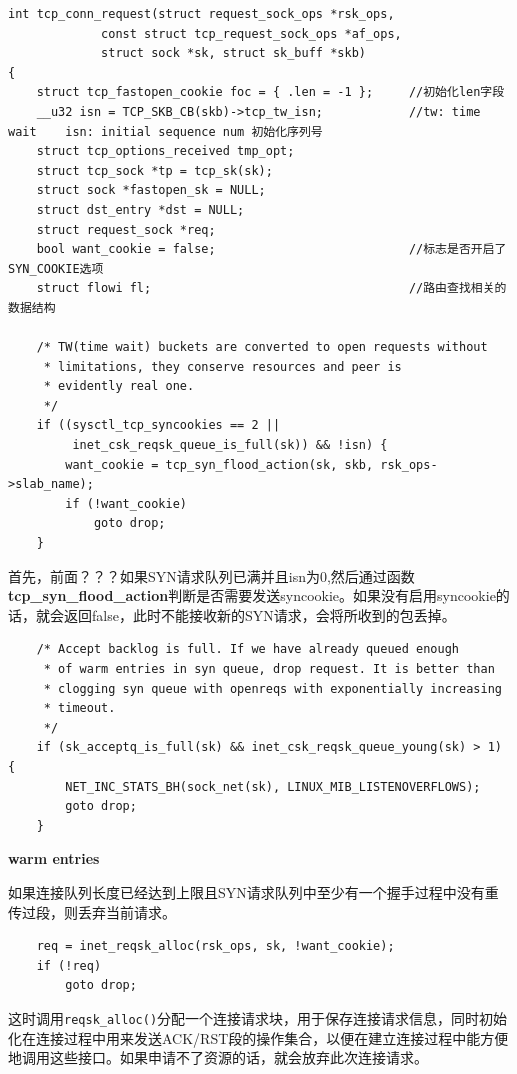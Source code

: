 \begin{verbatim}
int tcp_conn_request(struct request_sock_ops *rsk_ops,
             const struct tcp_request_sock_ops *af_ops,
             struct sock *sk, struct sk_buff *skb)
{
    struct tcp_fastopen_cookie foc = { .len = -1 };     //初始化len字段
    __u32 isn = TCP_SKB_CB(skb)->tcp_tw_isn;            //tw: time wait    isn: initial sequence num 初始化序列号 
    struct tcp_options_received tmp_opt;
    struct tcp_sock *tp = tcp_sk(sk);
    struct sock *fastopen_sk = NULL;
    struct dst_entry *dst = NULL;
    struct request_sock *req;
    bool want_cookie = false;                           //标志是否开启了SYN_COOKIE选项
    struct flowi fl;                                    //路由查找相关的数据结构

    /* TW(time wait) buckets are converted to open requests without
     * limitations, they conserve resources and peer is
     * evidently real one.
     */
    if ((sysctl_tcp_syncookies == 2 ||
         inet_csk_reqsk_queue_is_full(sk)) && !isn) {
        want_cookie = tcp_syn_flood_action(sk, skb, rsk_ops->slab_name);
        if (!want_cookie)
            goto drop;
    }
\end{verbatim}
                首先，前面？？？如果SYN请求队列已满并且isn为0,然后通过函数\textbf{tcp\_syn\_flood\_action}判断是否需要发送syncookie。如果没有启用syncookie的话，就会返回false，此时不能接收新的SYN请求，会将所收到的包丢掉。
\begin{verbatim}
    /* Accept backlog is full. If we have already queued enough
     * of warm entries in syn queue, drop request. It is better than
     * clogging syn queue with openreqs with exponentially increasing
     * timeout.
     */
    if (sk_acceptq_is_full(sk) && inet_csk_reqsk_queue_young(sk) > 1) {
        NET_INC_STATS_BH(sock_net(sk), LINUX_MIB_LISTENOVERFLOWS);
        goto drop;
    }
\end{verbatim}

        \textbf{warm entries}               
        
        如果连接队列长度已经达到上限且SYN请求队列中至少有一个握手过程中没有重传过段，则丢弃当前请求。

\begin{verbatim}
    req = inet_reqsk_alloc(rsk_ops, sk, !want_cookie);
    if (!req)
        goto drop;
\end{verbatim}
            
        这时调用\texttt{reqsk_alloc()}分配一个连接请求块，用于保存连接请求信息，同时初始化在连接过程中用来发送ACK/RST段的操作集合，以便在建立连接过程中能方便地调用这些接口。如果申请不了资源的话，就会放弃此次连接请求。

